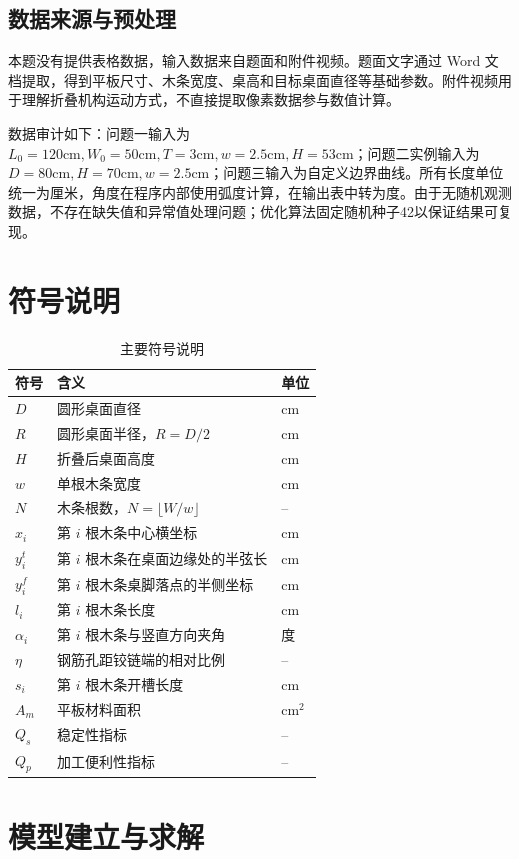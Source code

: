 \documentclass[UTF8,a4paper,12pt]{ctexart}
\newcommand{\cm}{\mathrm{cm}}
\begin{document}
\subsection{数据来源与预处理}
本题没有提供表格数据，输入数据来自题面和附件视频。题面文字通过 Word 文档提取，得到平板尺寸、木条宽度、桌高和目标桌面直径等基础参数。附件视频用于理解折叠机构运动方式，不直接提取像素数据参与数值计算。

数据审计如下：问题一输入为 $L_0=120\cm,W_0=50\cm,T=3\cm,w=2.5\cm,H=53\cm$；问题二实例输入为 $D=80\cm,H=70\cm,w=2.5\cm$；问题三输入为自定义边界曲线。所有长度单位统一为厘米，角度在程序内部使用弧度计算，在输出表中转为度。由于无随机观测数据，不存在缺失值和异常值处理问题；优化算法固定随机种子42以保证结果可复现。

\section{符号说明}
\begin{longtable}{p{3cm}p{9cm}p{2cm}}
\caption{主要符号说明}\label{tab:symbols}\\
\toprule
符号 & 含义 & 单位\\
\midrule
$D$ & 圆形桌面直径 & cm\\
$R$ & 圆形桌面半径，$R=D/2$ & cm\\
$H$ & 折叠后桌面高度 & cm\\
$w$ & 单根木条宽度 & cm\\
$N$ & 木条根数，$N=\lfloor W/w\rfloor$ & --\\
$x_i$ & 第 $i$ 根木条中心横坐标 & cm\\
$y_i^t$ & 第 $i$ 根木条在桌面边缘处的半弦长 & cm\\
$y_i^f$ & 第 $i$ 根木条桌脚落点的半侧坐标 & cm\\
$l_i$ & 第 $i$ 根木条长度 & cm\\
$\alpha_i$ & 第 $i$ 根木条与竖直方向夹角 & 度\\
$\eta$ & 钢筋孔距铰链端的相对比例 & --\\
$s_i$ & 第 $i$ 根木条开槽长度 & cm\\
$A_m$ & 平板材料面积 & $\cm^2$\\
$Q_s$ & 稳定性指标 & --\\
$Q_p$ & 加工便利性指标 & --\\
\bottomrule
\end{longtable}

\section{模型建立与求解}
\end{document}
